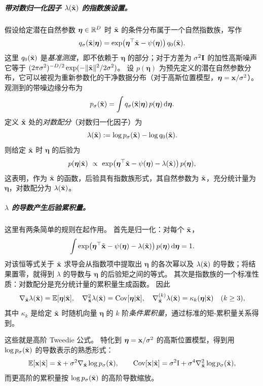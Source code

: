 \subparagraph{带对数归一化因子 $\lambda(\tilde{{\mathbf{x}}})$ 的指数族设置。}
假设给定潜在自然参数 $\boldsymbol\eta\in\mathbb{R}^D$ 时 $\tilde{{\mathbf{x}}}$ 的条件分布属于一个自然指数族，写作
\[
q_\sigma(\tilde{{\mathbf{x}}}|\boldsymbol\eta)
=\exp\!\big(\boldsymbol\eta^\top \tilde{{\mathbf{x}}}-\psi(\boldsymbol\eta)\big)\,q_0(\tilde{{\mathbf{x}}}).
\]
这里 $q_0(\tilde{{\mathbf{x}}})$ 是\emph{基准测度}，即不依赖于 $\boldsymbol\eta$ 的部分；对于方差为 $\sigma^2{\mathbf{I}}$ 的加性高斯噪声它等于 $(2\pi\sigma^2)^{-D/2}\exp(-\|\tilde{{\mathbf{x}}}\|^2/2\sigma^2)$。
设 $p(\boldsymbol\eta)$ 为预先定义的潜在自然参数分布，它可以被视为重新参数化的干净数据分布（对于高斯位置模型，$\boldsymbol\eta={\mathbf{x}}/\sigma^2$）。
观测到的带噪边缘分布为
\[
p_\sigma(\tilde{{\mathbf{x}}})=\int q_\sigma(\tilde{{\mathbf{x}}}|\boldsymbol\eta)\,p(\boldsymbol\eta)\mathop{}\!\mathrm{d}\boldsymbol\eta.
\]
定义 $\tilde{{\mathbf{x}}}$ 处的\emph{对数配分}（对数归一化因子）为
\[
\lambda(\tilde{{\mathbf{x}}}) := \log p_\sigma(\tilde{{\mathbf{x}}})-\log q_0(\tilde{{\mathbf{x}}}).
\]
则给定 $\tilde{{\mathbf{x}}}$ 时 $\boldsymbol\eta$ 的后验为
\[
p(\boldsymbol\eta|\tilde{{\mathbf{x}}})
\ \propto\
\exp\!\big(\boldsymbol\eta^\top \tilde{{\mathbf{x}}}-\psi(\boldsymbol\eta)-\lambda(\tilde{{\mathbf{x}}})\big)\,p(\boldsymbol\eta),
\]
这表明，作为 $\tilde{{\mathbf{x}}}$ 的函数，后验具有指数族形式，其自然参数为 $\tilde{{\mathbf{x}}}$，充分统计量为 $\boldsymbol\eta$，对数配分为 $\lambda(\tilde{{\mathbf{x}}})$。

\subparagraph{$\lambda$ 的导数产生后验累积量。}
这里有两条简单的规则在起作用。
首先是归一化：对每个 $\tilde{{\mathbf{x}}}$，
\[
\int \exp\!\big(\boldsymbol\eta^\top \tilde{{\mathbf{x}}}-\psi(\boldsymbol\eta)-\lambda(\tilde{{\mathbf{x}}})\big)\,p(\boldsymbol\eta)\mathop{}\!\mathrm{d}\boldsymbol\eta
=1.
\]
对该恒等式关于 $\tilde{{\mathbf{x}}}$ 求导会从指数项中提取出 $\boldsymbol\eta$ 的各次幂以及 $\lambda(\tilde{{\mathbf{x}}})$ 的导数；将结果置零，就得到 $\lambda$ 的导数与 $\boldsymbol\eta$ 的后验矩之间的等式。
其次是指数族的一个标准性质：对数配分是充分统计量的累积量生成函数。
因此
\[
\nabla_{\tilde{{\mathbf{x}}}}\lambda(\tilde{{\mathbf{x}}})=\mathbb{E}[\boldsymbol\eta|\tilde{{\mathbf{x}}}],\quad
\nabla_{\tilde{{\mathbf{x}}}}^{2}\lambda(\tilde{{\mathbf{x}}})=\mathrm{Cov}[\boldsymbol\eta|\tilde{{\mathbf{x}}}],\quad
\nabla_{\tilde{{\mathbf{x}}}}^{(k)}\lambda(\tilde{{\mathbf{x}}})=\kappa_k(\boldsymbol\eta|\tilde{{\mathbf{x}}})\quad(k\ge 3),
\]
其中 $\kappa_k$ 是给定 $\tilde{{\mathbf{x}}}$ 时随机向量 $\boldsymbol\eta$ 的 $k$ 阶\emph{条件累积量}，通过标准的矩-累积量关系得到。


这些就是高阶 Tweedie 公式。
特化到 $\boldsymbol\eta={\mathbf{x}}/\sigma^2$ 的高斯位置模型，得到用 $\log p_\sigma(\tilde{{\mathbf{x}}})$ 的导数表示的熟悉形式：
\[
\mathbb{E}[{\mathbf{x}}|\tilde{{\mathbf{x}}}]
=\tilde{{\mathbf{x}}}+\sigma^2\nabla_{\tilde{{\mathbf{x}}}}\log p_\sigma(\tilde{{\mathbf{x}}}),
\qquad
\mathrm{Cov}[{\mathbf{x}}|\tilde{{\mathbf{x}}}]
=\sigma^2\mathrm I+\sigma^4\nabla_{\tilde{{\mathbf{x}}}}^{2}\log p_\sigma(\tilde{{\mathbf{x}}}),
\]
而更高阶的累积量按 $\log p_\sigma(\tilde{{\mathbf{x}}})$ 的高阶导数缩放。


